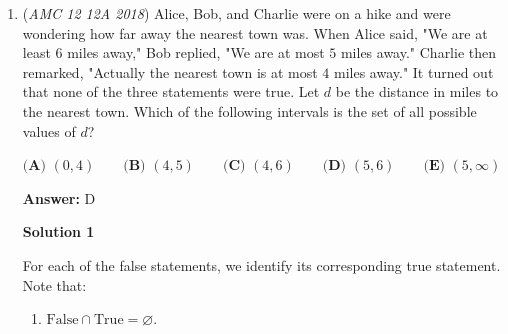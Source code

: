 \begin{enumerate}
 -LitJamal

 



\textbf{Solution 3}

We can tackle this problem with a stars-and-bars-ish approach. First, letting math class be 1 and non-math-class be 0, place 0s in between 3 1s:
 \[10101\]Now we need to place 1 additional 0. There are 4 places to put it: 
 \[\underline{\hspace{0.3cm}}1\underline{\hspace{0.3cm}}01\underline{\hspace{0.3cm}}01\underline{\hspace{0.3cm}}\] It can be placed in any 1 of the underscores.Since there are $3!=6$ ways to order the math classes, the answer is $6\cdot 4=\boxed{\textbf{(E) } 24}$.

 



\textbf{Solution 4}

Let $M$ represent a math class and $N$ represent a non-math class. We have \_N\_N\_N\_, where the spaces represent the possible spots the $M’s$ could go in. There are $4\choose 3$ ways to choose the spots for the math classes and $3!=6$ ways to order the classes. Hence, the answer is $4 \cdot 6 = \boxed{\textbf{(E) } 24}$.

 Education, the Study of Everything

 


	\item (\textit{AMC 12 12A 2018}) Alice, Bob, and Charlie were on a hike and were wondering how far away the nearest town was. When Alice said, "We are at least $6$ miles away," Bob replied, "We are at most $5$ miles away." Charlie then remarked, "Actually the nearest town is at most $4$ miles away." It turned out that none of the three statements were true. Let $d$ be the distance in miles to the nearest town. Which of the following intervals is the set of all possible values of $d$?


 $\textbf{(A) }   (0,4)   \qquad        \textbf{(B) }   (4,5)   \qquad    \textbf{(C) }   (4,6)   \qquad   \textbf{(D) }  (5,6)  \qquad  \textbf{(E) }   (5,\infty)$

 \textbf{Answer: }D



\textbf{Solution 1}

For each of the false statements, we identify its corresponding true statement. Note that:

 
            \begin{enumerate} 
        \item $\mathrm{False}\cap\mathrm{True}=\varnothing.$


\end{enumerate}
\end{enumerate}
